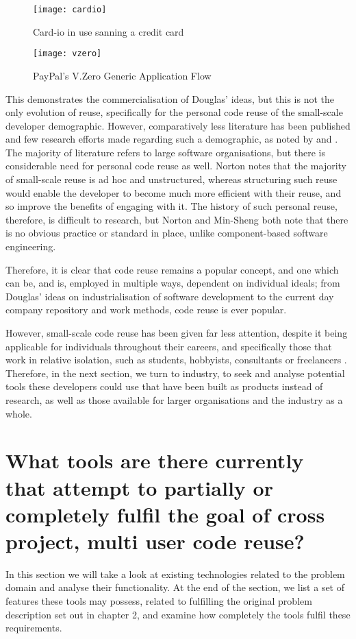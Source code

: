 \begin{figure}[ht!]
\centering
\texttt{[image: cardio]}
\caption{Card-io in use sanning a credit card \label{cardioscan}}
\end{figure}



\begin{figure}[ht!]
\centering
\texttt{[image: vzero]}
\caption{PayPal's V.Zero Generic Application Flow \label{vzeroflow}}
\end{figure}

This demonstrates the commercialisation of Douglas' ideas, but this is not the only evolution of reuse, specifically for the personal code reuse of the small-scale developer demographic. However, comparatively less literature has been published and few research efforts made regarding such a demographic, as noted by \cite{Norton2003a} and \cite{Hsieh2006}. The majority of literature refers to large software organisations, but there is considerable need for personal code reuse as well. Norton notes that the majority of small-scale reuse is ad hoc and unstructured, whereas structuring such reuse would enable the developer to become much more efficient with their reuse, and so improve the benefits of engaging with it. The history of such personal reuse, therefore, is difficult to research, but Norton and Min-Sheng both note that there is no obvious practice or standard in place, unlike component-based software engineering.

Therefore, it is clear that code reuse remains a popular concept, and one which can be, and is, employed in multiple ways, dependent on individual ideals; from Douglas' ideas on industrialisation of software development to the current day company repository and work methods, code reuse is ever popular. 

However, small-scale code reuse has been given far less attention, despite it being applicable for individuals throughout their careers, and specifically those that work in relative isolation, such as students, hobbyists, consultants or freelancers \cite{Norton2003a}. Therefore, in the next section, we turn to industry, to seek and analyse potential tools these developers could use that have been built as products instead of research, as well as those available for larger organisations and the industry as a whole.

\section{What tools are there currently that attempt to partially or completely fulfil the goal of cross project, multi user code reuse?}
In this section we will take a look at existing technologies related to the problem domain and analyse their functionality. At the end of the section, we list a set of features these tools may possess, related to fulfilling the original problem description set out in chapter 2, and examine how completely the tools fulfil these requirements.

